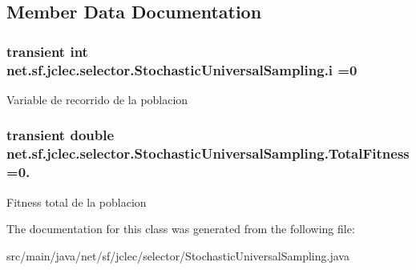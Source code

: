 \subsection{Member Data Documentation}
\hypertarget{classnet_1_1sf_1_1jclec_1_1selector_1_1_stochastic_universal_sampling_ae747f03bf49788753a9a248c98712145}{
\subsubsection[{i}]{\setlength{\rightskip}{0pt plus 5cm}transient int net.\-sf.\-jclec.\-selector.\-Stochastic\-Universal\-Sampling.\-i =0\hspace{0.3cm}{\ttfamily [protected]}}}\label{classnet_1_1sf_1_1jclec_1_1selector_1_1_stochastic_universal_sampling_ae747f03bf49788753a9a248c98712145}
Variable de recorrido de la poblacion \hypertarget{classnet_1_1sf_1_1jclec_1_1selector_1_1_stochastic_universal_sampling_ad110261827a129a7089916f339468a1a}{
\subsubsection[{Total\-Fitness}]{\setlength{\rightskip}{0pt plus 5cm}transient double net.\-sf.\-jclec.\-selector.\-Stochastic\-Universal\-Sampling.\-Total\-Fitness =0.\hspace{0.3cm}{\ttfamily [protected]}}}\label{classnet_1_1sf_1_1jclec_1_1selector_1_1_stochastic_universal_sampling_ad110261827a129a7089916f339468a1a}
Fitness total de la poblacion 

The documentation for this class was generated from the following file\-:\begin{DoxyCompactItemize}
\item 
src/main/java/net/sf/jclec/selector/Stochastic\-Universal\-Sampling.\-java\end{DoxyCompactItemize}
